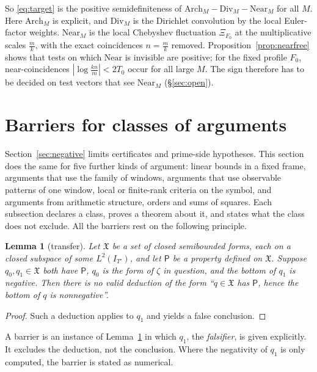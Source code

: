 \documentclass[11pt]{amsart}
\newtheorem{lemma}[theorem]{Lemma}
\theoremstyle{definition}
\theoremstyle{remark}
\begin{document}
So \eqref{eq:target} is the positive semidefiniteness of $\mathrm{Arch}_M-\mathrm{Div}_M-\mathrm{Near}_M$ for all $M$. Here
$\mathrm{Arch}_M$ is explicit, and $\mathrm{Div}_M$ is the Dirichlet convolution by the local Euler-factor weights. $\mathrm{Near}_M$
is the local Chebyshev fluctuation $\Xi_{F_0}$ at the multiplicative scales $\frac mk$, with the exact coincidences $n=\frac mk$
removed. Proposition~\ref{prop:nearfree} shows that tests on which $\mathrm{Near}$ is invisible are positive; for the fixed profile
$F_0$, near-coincidences $|\log\frac{kn}m|<2T_0$ occur for all large $M$. The sign therefore has to be decided on test vectors that
see $\mathrm{Near}_M$ (\S\ref{sec:open}).


\section{Barriers for classes of arguments}\label{sec:barriers}

Section~\ref{sec:negative} limits certificates and prime-side hypotheses. This section does the same for five
further kinds of argument: linear bounds in a fixed frame, arguments that use the family of windows,
arguments that use observable patterns of one window, local or finite-rank criteria on the symbol, and arguments
from arithmetic structure, orders and sums of squares.
Each subsection declares a class, proves a theorem about it, and states what the class does not exclude.
All the barriers rest on the following principle.

\begin{lemma}[transfer]\label{lem:transfer}
Let $\mathfrak X$ be a set of closed semibounded forms, each on a closed subspace of some $L^2(I_{T'})$, and let
$\mathsf P$ be a property defined on $\mathfrak X$. Suppose $q_0,q_1\in\mathfrak X$ both have $\mathsf P$, $q_0$ is the
form of $\zeta$ in question, and the bottom of $q_1$ is negative. Then there is no valid deduction of the form
``$q\in\mathfrak X$ has $\mathsf P$, hence the bottom of $q$ is nonnegative''.
\end{lemma}
\begin{proof}
Such a deduction applies to $q_1$ and yields a false conclusion.
\end{proof}

A barrier is an instance of Lemma~\ref{lem:transfer} in which $q_1$, the \emph{falsifier}, is given explicitly. It
excludes the deduction, not the conclusion. Where the negativity of $q_1$ is only computed, the barrier is stated
as numerical.
\end{document}
